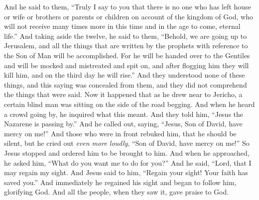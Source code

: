\begin{biblechapter}
\verse And he said to them, “Truly I say to you that there is no one who has left house or wife or brothers or parents or children on account of the kingdom of God,
\verse who will not receive many times more in this time and in the age to come, eternal life.”
 And taking aside the twelve, he said to them, “Behold, we are going up to Jerusalem, and all the things that are written by the prophets with reference to the Son of Man will be accomplished.
\verse For he will be handed over to the Gentiles and will be mocked and mistreated and spit on,
\verse and after flogging him they will kill him, and on the third day he will rise.”
\verse And they understood none of these things, and this saying was concealed from them, and they did not comprehend the things that were said.
 Now it happened that as he drew near to Jericho, a certain blind man was sitting on the side of the road begging.
\verse And when he heard a crowd going by, he inquired what this meant.
\verse And they told him, “Jesus the Nazarene is passing by.”
\verse And he called out, saying, “Jesus, Son of David, have mercy on me!”
\verse And those who were in front rebuked him, that he should be silent, but he cried out \textit{even more loudly}, “Son of David, have mercy on me!”
\verse So Jesus stopped and ordered him to be brought to him. And when he approached, he asked him,
\verse “What do you want me to do for you?” And he said, “Lord, that I may regain my sight.
\verse And Jesus said to him, “Regain your sight! Your faith has saved you.”
\verse And immediately he regained his sight and began to follow him, glorifying God. And all the people, when they saw it, gave praise to God.
\end{biblechapter}

